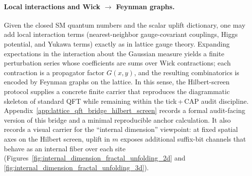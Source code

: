 \paragraph{Local interactions and Wick \texorpdfstring{$\to$}{->} Feynman graphs.}
Given the closed SM quantum numbers and the scalar uplift dictionary, one may add local interaction terms (nearest-neighbor gauge-covariant couplings, Higgs potential, and Yukawa terms) exactly as in lattice gauge theory.
Expanding expectations in the interaction about the Gaussian measure yields a finite perturbation series whose coefficients are sums over Wick contractions; each contraction is a propagator factor $G(x,y)$, and the resulting combinatorics is encoded by Feynman graphs on the lattice.
In this sense, the Hilbert-screen protocol supplies a concrete finite carrier that reproduces the diagrammatic skeleton of standard QFT while remaining within the tick\,+\,CAP audit discipline.
Appendix~\ref{app:lattice_qft_bridge_hilbert_screen} records a formal audit-facing version of this bridge and a minimal reproducible anchor calculation.
It also records a visual carrier for the ``internal dimension'' viewpoint: at fixed spatial axes on the Hilbert screen, uplift in $m$ exposes additional suffix-bit channels that behave as an internal fiber over each site (Figures~\ref{fig:internal_dimension_fractal_unfolding_2d} and \ref{fig:internal_dimension_fractal_unfolding_3d}).


